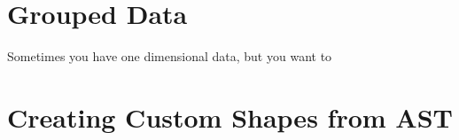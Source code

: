 
\newpage
\section{Grouped Data}\label{sec:tower}

Sometimes you have one dimensional data, but you want to 


\newpage
\section{Creating Custom Shapes from AST}\label{sec:csv}
